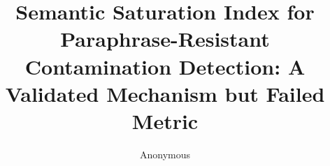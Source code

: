 \documentclass[letterpaper]{article}
\title{Semantic Saturation Index for Paraphrase-Resistant Contamination Detection: A Validated Mechanism but Failed Metric}
\author{Anonymous}
\date{}
\begin{document}
\maketitle

\begin{abstract}

\end{abstract}











\end{document}
